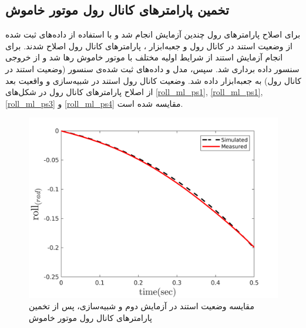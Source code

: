 \subsection{تخمین پارامترهای کانال رول موتور خاموش}
برای اصلاح پارامترهای رول چندین آزمایش انجام شد و با استفاده از داده‌های ثبت شده از وضعیت استند در کانال رول و جعبه‌ابزار
،
پارامترهای کانال رول اصلاح شدند.
برای انجام آزمایش استند از شرایط اولیه مختلف با موتور خاموش رها شد  و از خروجی سنسور داده برداری شد. سپس، مدل و داده‌های ثبت شده‌ی سنسور (وضعیت استند در کانال رول) به جعبه‌ابزار
داده شد. وضعیت کانال رول استند در شبیه‌سازی و واقعیت بعد از اصلاح پارامترهای کانال رول در شکل‌های
\ref{roll_ml_ps1}, \ref{roll_ml_ps1}, \ref{roll_ml_ps3} و \ref{roll_ml_ps4}
مقایسه شده است.

\begin{figure}[H]
	\includegraphics[width=12cm]{../Figures/RCP/roll_ml_parameter_estimation/RCP_roll_S2.png}
	\centering
	\caption{مقايسه وضعیت استند در  آزمايش دوم و شبیه‌سازی، پس از تخمین پارامترهای کانال رول موتور خاموش}
	\label{roll_ml_ps2}
\end{figure}
